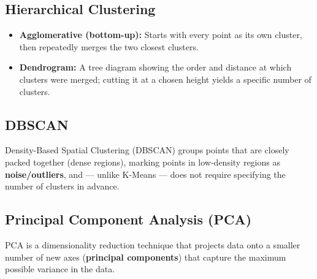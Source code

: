 \documentclass[11pt,a4paper]{article}
\begin{document}
\subsection{Hierarchical Clustering}
\begin{itemize}[leftmargin=*]
  \item \textbf{Agglomerative (bottom-up):} Starts with every point as its own cluster, then repeatedly merges the two closest clusters.
  \item \textbf{Dendrogram:} A tree diagram showing the order and distance at which clusters were merged; cutting it at a chosen height yields a specific number of clusters.
\end{itemize}

\subsection{DBSCAN}
\begin{definitionbox}[DBSCAN]
Density-Based Spatial Clustering (DBSCAN) groups points that are closely packed together (dense regions), marking points in low-density regions as \textbf{noise/outliers}, and --- unlike K-Means --- does not require specifying the number of clusters in advance.
\end{definitionbox}

\subsection{Principal Component Analysis (PCA)}
\begin{definitionbox}[PCA]
PCA is a dimensionality reduction technique that projects data onto a smaller number of new axes (\textbf{principal components}) that capture the maximum possible variance in the data.
\end{definitionbox}

\begin{center}
\end{center}
\end{document}
